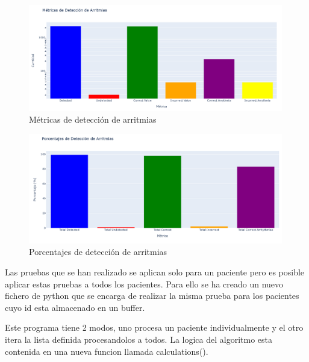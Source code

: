 \begin{figure}[h!]
	\centering
    \includegraphics[width=0.99\textwidth]{./Images/img_algoritmo/estadisticas_arritmias_1.png}
    \caption{Métricas de detección de arritmias}
    \label{fig:estadisticas_algoritmos_1}
\end{figure} 

\begin{figure}[h!]
	\centering
    \includegraphics[width=0.99\textwidth]{./Images/img_algoritmo/estadisticas_arritmias_2.png}
    \caption{Porcentajes de detección de arritmias}
    \label{fig:estadisticas_algoritmos_2}
\end{figure} 


Las pruebas que se han realizado se aplican solo para un paciente pero es posible aplicar estas pruebas a todos los pacientes.
Para ello se ha creado un nuevo fichero de python que se encarga de realizar la misma prueba para los pacientes cuyo id esta
almacenado en un buffer.

Este programa tiene 2 modos, uno procesa un paciente individualmente y el otro itera la lista definida procesandolos a todos. La
logica del algoritmo esta contenida en una nueva funcion llamada calculations().

